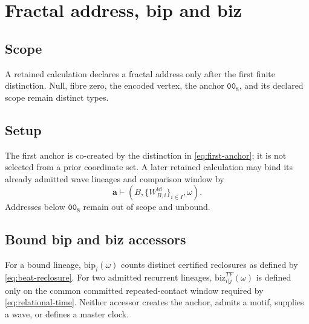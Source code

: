 \section{Fractal address, bip and biz}
\label{app:fractal-address-bip-biz}

\subsection{Scope}
\label{app:fractal-address:scope}
A retained calculation declares a fractal address only after the first finite
distinction. Null, fibre zero, the encoded vertex, the anchor
\(\mathtt{00}_8\), and its declared scope remain distinct types.

\subsection{Setup}
\label{app:fractal-address:setup}
The first anchor is co-created by the distinction in \eqref{eq:first-anchor}; it
is not selected from a prior coordinate set. A later retained calculation may
bind its already admitted wave lineages and comparison window by
\[
\mathbf a\vdash(B,\{W_{B,i}^{\mathrm{id}}\}_{i\in I},\omega).
\]
Addresses below \(\mathtt{00}_8\) remain out of scope and unbound.

\subsection{Bound bip and biz accessors}
\label{app:fractal-address:statements}
For a bound lineage, \(\mathrm{bip}_i(\omega)\) counts distinct certified
reclosures as defined by \eqref{eq:beat-reclosure}. For two admitted recurrent
lineages, \(\mathrm{biz}^{TF}_{i|j}(\omega)\) is defined only on the common
committed repeated-contact window required by \eqref{eq:relational-time}.
Neither accessor creates the anchor, admits a motif, supplies a wave, or
defines a master clock.


